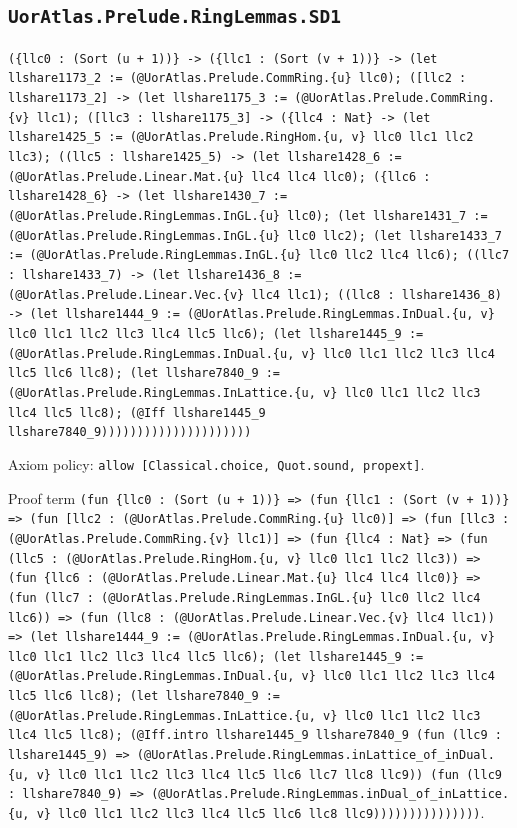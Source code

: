 \documentclass[11pt]{article}
\begin{document}
\subsection*{\texttt{UorAtlas.Prelude.RingLemmas.SD1}}
\noindent\texttt{(\{llc0 : (Sort (u + 1))\} -> (\{llc1 : (Sort (v + 1))\} -> (let llshare1173\_2 := (@UorAtlas.Prelude.CommRing.\{u\} llc0); ([llc2 : llshare1173\_2] -> (let llshare1175\_3 := (@UorAtlas.Prelude.CommRing.\{v\} llc1); ([llc3 : llshare1175\_3] -> (\{llc4 : Nat\} -> (let llshare1425\_5 := (@UorAtlas.Prelude.RingHom.\{u, v\} llc0 llc1 llc2 llc3); ((llc5 : llshare1425\_5) -> (let llshare1428\_6 := (@UorAtlas.Prelude.Linear.Mat.\{u\} llc4 llc4 llc0); (\{llc6 : llshare1428\_6\} -> (let llshare1430\_7 := (@UorAtlas.Prelude.RingLemmas.InGL.\{u\} llc0); (let llshare1431\_7 := (@UorAtlas.Prelude.RingLemmas.InGL.\{u\} llc0 llc2); (let llshare1433\_7 := (@UorAtlas.Prelude.RingLemmas.InGL.\{u\} llc0 llc2 llc4 llc6); ((llc7 : llshare1433\_7) -> (let llshare1436\_8 := (@UorAtlas.Prelude.Linear.Vec.\{v\} llc4 llc1); ((llc8 : llshare1436\_8) -> (let llshare1444\_9 := (@UorAtlas.Prelude.RingLemmas.InDual.\{u, v\} llc0 llc1 llc2 llc3 llc4 llc5 llc6); (let llshare1445\_9 := (@UorAtlas.Prelude.RingLemmas.InDual.\{u, v\} llc0 llc1 llc2 llc3 llc4 llc5 llc6 llc8); (let llshare7840\_9 := (@UorAtlas.Prelude.RingLemmas.InLattice.\{u, v\} llc0 llc1 llc2 llc3 llc4 llc5 llc8); (@Iff llshare1445\_9 llshare7840\_9)))))))))))))))))))))}\par
\noindent Axiom policy: \texttt{allow [Classical.choice, Quot.sound, propext]}.\par
\noindent Proof term \texttt{(fun \{llc0 : (Sort (u + 1))\} => (fun \{llc1 : (Sort (v + 1))\} => (fun [llc2 : (@UorAtlas.Prelude.CommRing.\{u\} llc0)] => (fun [llc3 : (@UorAtlas.Prelude.CommRing.\{v\} llc1)] => (fun \{llc4 : Nat\} => (fun (llc5 : (@UorAtlas.Prelude.RingHom.\{u, v\} llc0 llc1 llc2 llc3)) => (fun \{llc6 : (@UorAtlas.Prelude.Linear.Mat.\{u\} llc4 llc4 llc0)\} => (fun (llc7 : (@UorAtlas.Prelude.RingLemmas.InGL.\{u\} llc0 llc2 llc4 llc6)) => (fun (llc8 : (@UorAtlas.Prelude.Linear.Vec.\{v\} llc4 llc1)) => (let llshare1444\_9 := (@UorAtlas.Prelude.RingLemmas.InDual.\{u, v\} llc0 llc1 llc2 llc3 llc4 llc5 llc6); (let llshare1445\_9 := (@UorAtlas.Prelude.RingLemmas.InDual.\{u, v\} llc0 llc1 llc2 llc3 llc4 llc5 llc6 llc8); (let llshare7840\_9 := (@UorAtlas.Prelude.RingLemmas.InLattice.\{u, v\} llc0 llc1 llc2 llc3 llc4 llc5 llc8); (@Iff.intro llshare1445\_9 llshare7840\_9 (fun (llc9 : llshare1445\_9) => (@UorAtlas.Prelude.RingLemmas.inLattice\_of\_inDual.\{u, v\} llc0 llc1 llc2 llc3 llc4 llc5 llc6 llc7 llc8 llc9)) (fun (llc9 : llshare7840\_9) => (@UorAtlas.Prelude.RingLemmas.inDual\_of\_inLattice.\{u, v\} llc0 llc1 llc2 llc3 llc4 llc5 llc6 llc8 llc9)))))))))))))))}.\par
\end{document}

